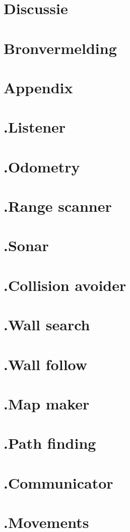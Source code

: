 \documentclass[a4paper,10pt]{article}
\begin{document}
\section{Discussie}
\section{Bronvermelding}
\newpage
\section{Appendix}
\appendix
\section*{\label{listener}\thesection.\quad Listener}
\section*{\label{odometry}\thesection.\quad Odometry}
\section*{\label{rangescanner}\thesection.\quad Range scanner}
\section*{\label{sonar}\thesection.\quad Sonar}
\section*{\label{collisionavoider}\thesection.\quad Collision avoider}
\section*{\label{wallsearch}\thesection.\quad Wall search}
\section*{\label{wallfollow}\thesection.\quad Wall follow}
\section*{\label{mapmaker}\thesection.\quad Map maker}
\section*{\label{pathfinding}\thesection.\quad Path finding}
\section*{\label{communicator}\thesection.\quad Communicator}
\section*{\label{movements}\thesection.\quad Movements}
\end{document}
